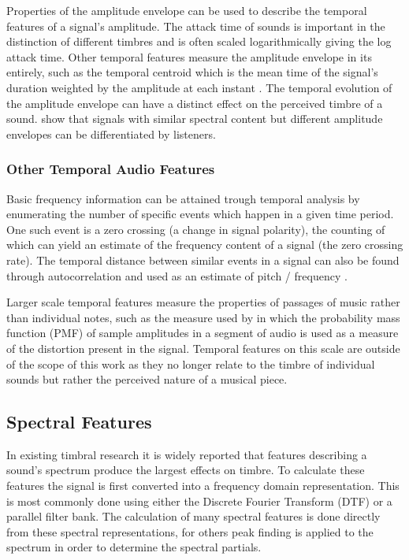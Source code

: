 			Properties of the amplitude envelope can be used to describe the temporal features of a signal's
			amplitude. The attack time of sounds is important in the distinction of different timbres
			\citep{ilmoniemi2004subjective} and is often scaled logarithmically giving the log attack time.
			Other temporal features measure the amplitude envelope in its entirely, such as the temporal
			centroid which is the mean time of the signal's duration weighted by the amplitude at each instant
			\citep{peeters2000instrument}. The temporal evolution of the amplitude envelope can have a distinct
			effect on the perceived timbre of a sound. \citet{patterson1994the} show that signals with similar
			spectral content but different amplitude envelopes can be differentiated by listeners.

		\subsubsection*{Other Temporal Audio Features}
			Basic frequency information can be attained trough temporal analysis by enumerating the number of
			specific events which happen in a given time period. One such event is a zero crossing (a change in
			signal polarity), the counting of which can yield an estimate of the frequency content of a signal
			(the zero crossing rate). The temporal distance between similar events in a signal can also be
			found through autocorrelation and used as an estimate of pitch / frequency \citep{mcleod2005a}.

			Larger scale temporal features measure the properties of passages of music rather than individual
			notes, such as the measure used by \citet{wilson2014profiling} in which the probability mass
			function (PMF) of sample amplitudes in a segment of audio is used as a measure of the distortion
			present in the signal.  Temporal features on this scale are outside of the scope of this work as
			they no longer relate to the timbre of individual sounds but rather the perceived nature of a
			musical piece.

	\subsection{Spectral Features}
	\label{sec:Timbre-LowLevelFeatures-Spectral}
		In existing timbral research it is widely reported that features describing a sound's spectrum produce the
		largest effects on timbre. To calculate these features the signal is first converted into a frequency
		domain representation. This is most commonly done using either the Discrete Fourier Transform (DTF) or a
		parallel filter bank. The calculation of many spectral features is done directly from these spectral
		representations, for others peak finding is applied to the spectrum in order to determine the spectral
		partials.

